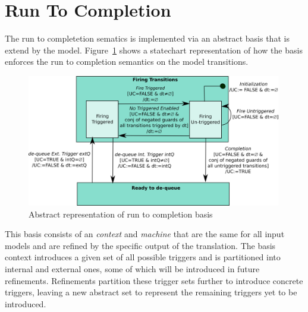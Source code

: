 

\section{Run To Completion}

The run to completetion sematics is implemented via an abstract basis that is extend by the model. 
Figure~\ref{fig:basis} shows a statechart representation of how the basis enforces 
the run to completion semantics on the model transitions.
\begin{figure}[!h]
	\vspace{-.4cm}
	\centering
	\includegraphics[width=0.99\textwidth]{figures/basis.png}
	\caption{Abstract representation of run to completion basis}
	\label{fig:basis}
	\vspace{-.4cm}
\end{figure}

This basis consists of an \EVENTB \emph{context} and \emph{machine} that are 
the same for all input models and are refined by the specific output of the translation.  
The basis context introduces a given set of all 
possible triggers and is partitioned into internal and external ones, 
some of which will be introduced in future refinements. 
Refinements partition these trigger sets further to introduce concrete triggers, 
leaving a new abstract set to represent the remaining triggers yet to be introduced. 


